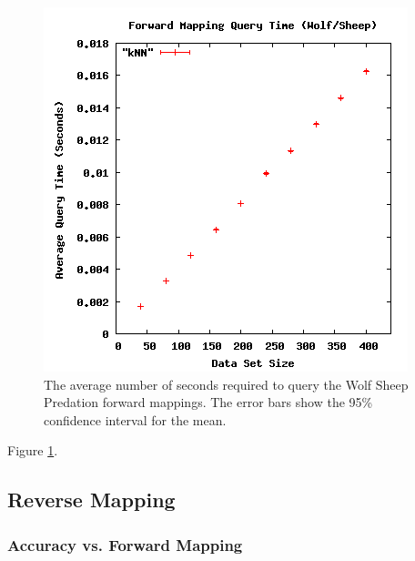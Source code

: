 \begin{figure}[ht]
\centering
\includegraphics[scale=.5]{images/results_wolfsheep/fm-query.png}
\caption{The average number of seconds required to query the Wolf Sheep Predation forward mappings.
The error bars show the 95\% confidence interval for the mean.}
\label{fig:wolfsheepfmquery}
\end{figure}

Figure \ref{fig:wolfsheepfmquery}.



 \subsection{Reverse Mapping}

  \subsubsection{Accuracy vs. Forward Mapping}

